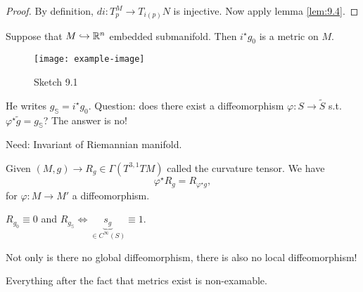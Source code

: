 \begin{proof}
    By definition, \(di:T_p^M\to T_{i(p)}N\) is injective. Now apply lemma \ref{lem:9.4}.
\end{proof}

\begin{example}
    Suppose that \(M\hookrightarrow \mathbb{R}^n\) embedded submanifold. Then \(i^\star g_0\) is a 
    metric on \(M\).
    \begin{figure}[H]\label{fig:9.1}
        \centering
        \texttt{[image: example-image]}
        \caption{Sketch 9.1}
    \end{figure}
    He writes \(g_{\mathbb{S}}=i^\star g_0\).
    Question: does there exist a diffeomorphism \(\varphi:S\to \tilde{S}\) s.t. 
    \(\varphi^\star \tilde{g}=g_{\mathbb{S}}\)? The answer is no!

    Need: Invariant of Riemannian manifold.

\end{example}

Given \((M,g)\to R_g\in \Gamma(T^{3,1}TM)\) called the curvature tensor. We have 
\[\varphi^\star R_g=R_{\varphi^\star g},\]
for \(\varphi:M\to M'\) a diffeomorphism.

 \(R_{g_0}\equiv 0\) and \(R_{g_{\mathbb{S}}}\iff \underbrace{s_{g}}_{\in C^\infty(S)}\equiv 1\).

Not only is there no global diffeomorphism, there is also no local diffeomorphism!

Everything after the fact that metrics exist is non-examable.

